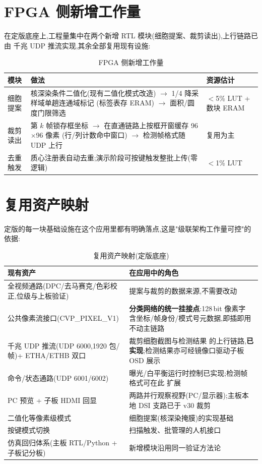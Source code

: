 \section{FPGA 侧新增工作量}

在定版底座上,工程量集中在两个新增 RTL 模块(细胞提案、裁剪读出),上行链路已由
千兆 UDP 推流实现,其余全部复用现有设施:

\begin{table}[h!]\centering\small
\caption{FPGA 侧新增工作量}
\begin{tabular}{p{2.6cm}p{9.2cm}p{2.6cm}}
\toprule
模块 & 做法 & 资源估计 \\
\midrule
细胞提案 & 核深染条件二值化(现有二值化模式改造) $\to$ 1/4 降采样域单趟连通域标记
(标签表存 ERAM) $\to$ 面积/圆度门限筛选 & $<$5\% LUT + 数块 ERAM \\
裁剪读出 & 第 $k$ 帧锁存框坐标 $\to$ 在直通链路上按框开窗缓存 96$\times$96 像素
(行/列计数命中窗口) $\to$ 检测帧格式随 UDP 上行 & 复用为主 \\
去重触发 & 质心注册表自动去重;演示阶段可按键触发整批上传(零逻辑) & $<$1\% LUT \\
\bottomrule
\end{tabular}
\end{table}

\section{复用资产映射}

定版的每一块基础设施在这个应用里都有明确落点,这是"级联架构工作量可控"的依据:

\begin{table}[h!]\centering\small
\caption{复用资产映射(定版底座)}
\begin{tabular}{p{5.4cm}p{9cm}}
\toprule
现有资产 & 在应用中的角色 \\
\midrule
全视频通路(DPC/去马赛克/色彩校正,位级与上板验证) & 提案与裁剪的数据来源,不需要改动 \\
公共像素流接口(CVP\_PIXEL\_V1) & \textbf{分类网络的统一挂接点}:128\,bit 像素字
含坐标/帧身份/模式号元数据,即插即用不动主链路 \\
千兆 UDP 推流(UDP 6000,1920 包/帧)+ ETHA/ETHB 双口 & 裁剪细胞截图与检测结果
的上行链路,\textbf{已实现};检测结果亦可经镜像口驱动子板 OSD 展示 \\
命令/状态通路(UDP 6001/6002) & 曝光/白平衡运行时控制已实现;检测帧格式可在此
扩展 \\
PC 预览 + 子板 HDMI 回显 & 两路并行观察视野(PC/显示器);主板本地 DSI 支路已于 v30 裁剪 \\
二值化等像素级模式 & 细胞提案(核深染掩膜)的实现基础 \\
按键模式切换 & 扫描触发、批管理的人机接口 \\
仿真回归体系(主板 RTL/Python + 子板记分板) & 新增模块沿用同一验证方法论 \\
\bottomrule
\end{tabular}
\end{table}


